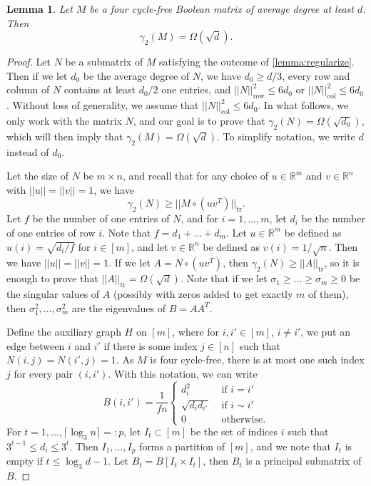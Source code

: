 \documentclass[11pt]{amsart}
\theoremstyle{plain}
\newtheorem{lemma}[theorem]{Lemma}
\theoremstyle{definition}
\DeclareMathOperator{\tr}{tr}
\DeclareMathOperator{\row}{row}
\DeclareMathOperator{\col}{col}
\begin{document}
\begin{lemma}\label{lemma:C4-free}
Let $M$ be a four cycle-free Boolean matrix of average degree at least $d$. Then $$\gamma_2(M)=\Omega(\sqrt{d}).$$
\end{lemma}
\begin{proof}
Let $N$ be a submatrix of $M$ satisfying the outcome of \cref{lemma:regularize}. Then if we let $d_0$ be the average degree of $N$, we have $d_0\geq d/3$, every row and column of $N$ contains at least $d_0/2$ one entries, and $||N||_{\row}^2\leq 6d_0$ or $||N||_{\col}^2\leq 6d_0$. Without loss of generality, we assume that $||N||_{\col}^2\leq 6d_0$. In what follows, we only work with the matrix $N$, and our goal is to prove that $\gamma_2(N)=\Omega(\sqrt{d_0})$, which will then imply that $\gamma_2(M)=\Omega(\sqrt{d})$. To simplify notation, we write $d$ instead of $d_0$.

Let the size of $N$ be $m\times n$, and recall that for any choice of $u\in \mathbb{R}^m$ and $v\in \mathbb{R}^n$ with $||u||=||v||=1$, we have
$$\gamma_2(N)\geq ||M\circ (uv^T)||_{\tr}.$$
Let $f$ be the number of one entries of $N$, and for $i=1,\dots,m$, let $d_i$ be the number of one entries of row $i$. Note that $f=d_1+\dots+d_m$. Let $u\in \mathbb{R}^m$ be defined as $u(i)=\sqrt{d_i/f}$ for $i\in [m]$, and let $v\in \mathbb{R}^n$ be defined as $v(i)=1/\sqrt{n}$. Then we have $||u||=||v||=1$. If we let $A=N\circ (uv^T)$, then $\gamma_2(N)\geq ||A||_{\tr}$, so it is enough to prove that $||A||_{\tr}=\Omega(\sqrt{d})$. Note that if we let $\sigma_1\geq \dots\geq \sigma_m\geq 0$ be the singular values of $A$ (possibly with zeros added to get exactly $m$ of them), then $\sigma_1^2,\dots,\sigma_m^2$ are the eigenvalues of $B=AA^T$. 

Define the auxiliary graph $H$ on $[m]$, where for $i,i'\in [m]$, $i\neq i'$, we put an edge between $i$ and $i'$ if there is some index $j\in [n]$ such that $N(i,j)=N(i',j)=1$. As $M$ is four cycle-free, there is at most one such index $j$ for every pair $(i,i')$. With this notation, we can write
$$B(i,i')=\frac{1}{fn}\begin{cases} d_i^2 &\mbox{ if }i=i'\\
                        \sqrt{d_id_{i'}} &\mbox{ if }i\sim i'\\
                        0 &\mbox{ otherwise.}\end{cases}$$
For $t=1,\dots,\lceil\log_3 n\rceil=:p$, let $I_t\subset [m]$ be the set of indices $i$ such that $3^{t-1}\leq d_i\leq 3^t$. Then $I_1,\dots,I_p$ forms a partition of $[m]$, and we note that $I_t$ is empty if $t\leq \log_3 d-1$. Let $B_t=B[I_t\times I_t]$, then $B_t$ is a principal submatrix of $B$.


\end{proof}
\end{document}
